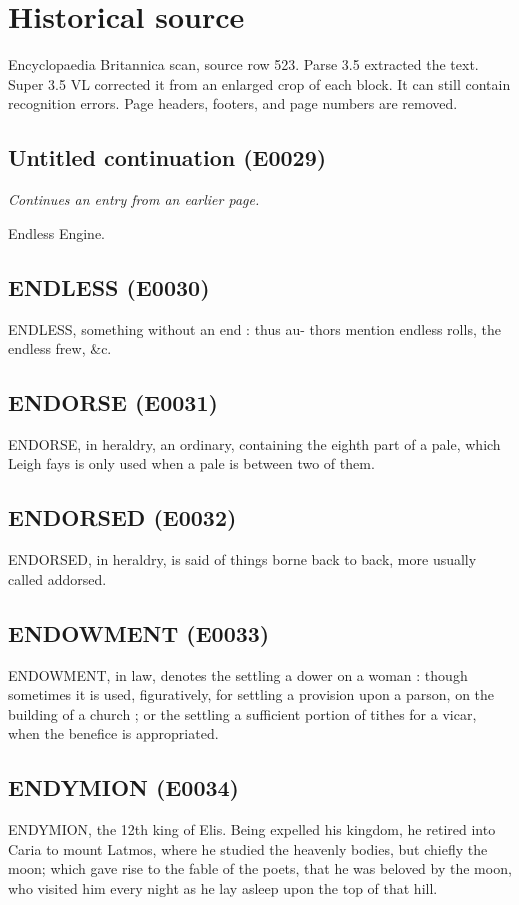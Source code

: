 \documentclass{article}
\begin{document}
\section*{Historical source}
Encyclopaedia Britannica scan, source row 523. Parse 3.5 extracted the text. Super 3.5 VL corrected it from an enlarged crop of each block. It can still contain recognition errors.
Page headers, footers, and page numbers are removed.

\subsection*{Untitled continuation (E0029)}
\textit{Continues an entry from an earlier page.}

Endless
Engine.

\subsection*{ENDLESS (E0030)}
ENDLESS, something without an end : thus au-
thors mention endless rolls, the endless frew, \&c.

\subsection*{ENDORSE (E0031)}
ENDORSE, in heraldry, an ordinary, containing the eighth part of a pale, which Leigh fays is only used when a pale is between two of them.

\subsection*{ENDORSED (E0032)}
ENDORSED, in heraldry, is said of things borne back to back, more usually called addorsed.

\subsection*{ENDOWMENT (E0033)}
ENDOWMENT, in law, denotes the settling a dower on a woman : though sometimes it is used, figuratively, for settling a provision upon a parson, on the building of a church ; or the settling a sufficient portion of tithes for a vicar, when the benefice is appropriated.

\subsection*{ENDYMION (E0034)}
ENDYMION, the 12th king of Elis. Being expelled his kingdom, he retired into Caria to mount Latmos, where he studied the heavenly bodies, but chiefly the moon; which gave rise to the fable of the poets, that he was beloved by the moon, who visited him every night as he lay asleep upon the top of that hill.
\end{document}
